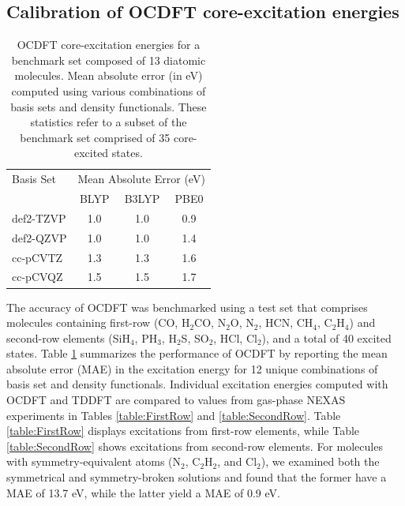 \documentclass[8.5pt,twoside,twocolumn]{article}
\begin{document}
\subsection{Calibration of OCDFT core-excitation energies}
\begin{table}[!b]
\small
\caption{OCDFT core-excitation energies for a benchmark set composed of 13 diatomic molecules.  Mean absolute error (in eV) computed using various combinations of basis sets and density functionals. These statistics refer to a subset of the benchmark set comprised of 35 core-excited states.}
\centering
    \begin{tabular}{lccc}
    \hline
    \hline
Basis Set & \multicolumn{3}{c}{Mean Absolute Error (eV)}  \\
& BLYP & B3LYP & PBE0\\
\hline
def2-TZVP & 1.0 & 1.0 & 0.9 \\
def2-QZVP & 1.0 & 1.0 & 1.4 \\
cc-pCVTZ & 1.3 & 1.3 & 1.6 \\
cc-pCVQZ & 1.5 & 1.5 & 1.7 \\
\hline
\hline
\end{tabular}
\label{table:OverallPerformance}
\end{table}
The accuracy of OCDFT was benchmarked using a test set that comprises molecules containing first-row (CO, H$_2$CO, N$_2$O, N$_2$, HCN, CH$_4$, C$_2$H$_4$) and second-row elements (SiH$_4$, PH$_3$, H$_2$S, SO$_2$, HCl, Cl$_2$), and a total of 40 excited states. 
Table \ref{table:OverallPerformance} summarizes the performance of OCDFT by reporting the mean absolute error (MAE) in the excitation energy for 12 unique combinations of basis set and density functionals.
Individual excitation energies computed with OCDFT and TDDFT are compared to values from gas-phase NEXAS experiments \cite{puttner_vibrationally_1999,remmers_high-resolution_1992,chen_k-shell_1989,tronc_nitrogen_1980,tronc_carbon_1979,francis_studies_1994,adachi_vibronic_1999,hitchcock_k-shell_1979,domke_carbon_1990,nayandin_angle-resolved_2001,bodeur_single-and_1990,gedat_s_1998,hudson_high-resolution_1994,cavell_chemical_1999,bodeur_photoabsorption_1985} in Tables \ref{table:FirstRow} and \ref{table:SecondRow}. Table \ref{table:FirstRow} displays excitations from first-row elements, while Table \ref{table:SecondRow} shows excitations from second-row elements. For molecules with symmetry-equivalent atoms (N$_2$, C$_2$H$_2$, and Cl$_2$), we examined both the symmetrical and symmetry-broken solutions and found that the former have a MAE of 13.7 eV, while the latter yield a MAE of 0.9 eV.
\end{document}

